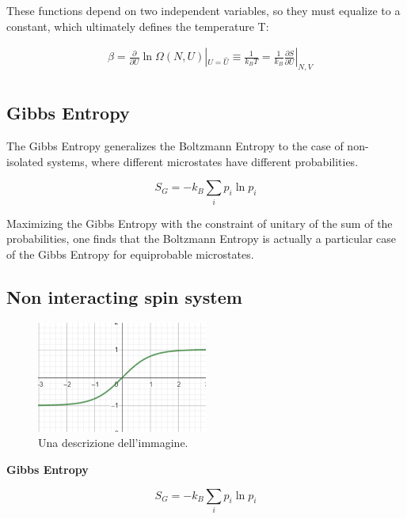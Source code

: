 \documentclass{article}
\begin{document}
These functions depend on two independent variables, so they must equalize to a constant, which ultimately defines the temperature T:

\begin{equation}
    \begin{aligned}
         & \beta=\frac{\partial}{\partial U}\ln{\Omega(N,U)}|_{U=\hat{U}} \equiv \frac{1}{k_BT}= \frac{1}{k_B}\frac{\partial S}{\partial U}|_{N,V} \\
    \end{aligned}
\end{equation}

\subsection{Gibbs Entropy}
The Gibbs Entropy generalizes the Boltzmann Entropy to the case of non-isolated systems, where different microstates have different probabilities.

\begin{equation}
    S_G=-k_B\sum_{i}p_i\ln{p_i}
\end{equation}

Maximizing the Gibbs Entropy with the constraint of unitary of the sum of the probabilities, one finds that
the Boltzmann Entropy is actually a particular case of the Gibbs Entropy for equiprobable microstates.

\subsection{Non interacting spin system}

\begin{figure}[h]
    \centering
    \includegraphics[width=0.5\textwidth]{images/magnetization-mc.png}
    \caption{Una descrizione dell'immagine.}
    \label{fig:magnetization-mc}
\end{figure}

\newpage

\begin{tcolorbox}[colframe=gray!90, colback=gray!5, coltitle=white, sharp corners, title=\textbf{Microcanonical Ensamble, Summary}, fonttitle=\large\bfseries]
    \textbf{Gibbs Entropy}
    \vspace{0.5em}

    \begin{equation}
        S_G = -k_B \sum_{i} p_i \ln{p_i}
    \end{equation}



\end{tcolorbox}
\end{document}

